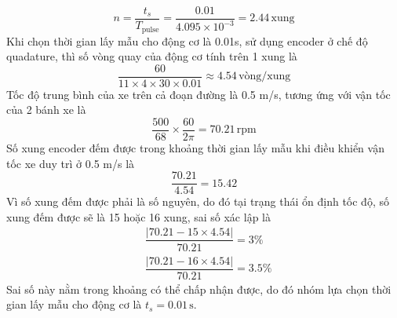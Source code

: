                \begin{equation*}
                    n = \dfrac{t_s}{T_{\text{pulse}}} = \dfrac{0.01}{4.095 \times 10^{-3}} = 2.44 \,\mathrm{xung}
               \end{equation*}
               Khi chọn thời gian lấy mẫu cho động cơ là 0.01s, sử dụng encoder ở chế độ quadature, thì số vòng quay của động cơ tính trên 1 xung là
               \begin{equation*}
                    \dfrac{60}{11 \times 4 \times 30 \times 0.01} \approx 4.54 \,\text{vòng/xung}
               \end{equation*}
               Tốc độ trung bình của xe trên cả đoạn đường là 0.5 m/s, tương ứng với vận tốc của 2 bánh xe là
               \begin{equation*}
                    \dfrac{500}{68} \times \dfrac{60}{2 \pi} = 70.21 \,\mathrm{rpm}
               \end{equation*}
               Số xung encoder đếm được trong khoảng thời gian lấy mẫu khi điều khiển vận tốc xe duy trì ở 0.5 m/s là
               \begin{equation*}
                    \dfrac{70.21}{4.54} = 15.42
               \end{equation*}
               Vì số xung đếm được phải là số nguyên, do đó tại trạng thái ổn định tốc độ, số xung đếm được sẽ là 15 hoặc 16 xung, sai số xác lập là
               \begin{align*}
                    &\dfrac{|70.21 - 15 \times 4.54|}{70.21} = 3 \%\\
                    &\dfrac{|70.21 - 16 \times 4.54|}{70.21} = 3.5 \%
               \end{align*}
               Sai số này nằm trong khoảng có thể chấp nhận được, do đó nhóm lựa chọn thời gian lấy mẫu cho động cơ là $t_s = 0.01 \,\mathrm{s}$.


               
